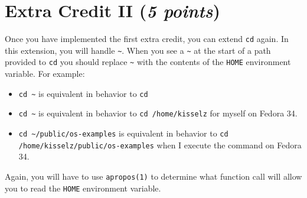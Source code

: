 \documentclass [12pt, letterpaper] {article}
\begin{document}
\section*{Extra Credit II (\emph{5 points})}
Once you have implemented the first extra credit, you can extend \texttt{cd} again. In this
extension, you will handle \verb#~#. When you see a \verb#~# at the start of a path provided to
\texttt{cd} you should replace \verb#~# with the contents of the \verb#HOME# environment variable.
For example:
\begin{itemize}
 \item \verb#cd ~# is equivalent in behavior to \texttt{cd}
 \item \verb#cd ~# is equivalent in behavior to \texttt{cd /home/kisselz} for myself on Fedora 34.
 \item \verb#cd ~/public/os-examples# is equivalent in behavior to \texttt{cd /home/kisselz/public/os-examples} when
       I execute the command on Fedora 34.
\end{itemize}
Again, you will have to use \texttt{apropos(1)} to determine what function call will allow you to read
the \verb#HOME# environment variable.
\end{document}
